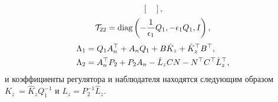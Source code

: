 \begin{theorem}
\begin{equation}
\begin{bmatrix}
		\end{bmatrix},
	\end{equation}
	\begin{equation}
		\mathcal{T}_{22}=\textnormal{diag}\left(-\frac{1}{\epsilon_1}{Q}_1,-\epsilon_1{Q}_1,{I}\right),
	\end{equation}%
	\begin{align}
		\label{eq:Lambda_1}
		{\Lambda}_1&={Q}_1{A}_n^\top+{A}_n{Q}_1+{B}\hat{{K}}_z+\hat{{K}}_z^\top{B}^\top, \\
		\label{eq:Lambda_2}
		{\Lambda}_2&={A}_n^\top{P}_2+{P}_2{A}_n-\hat{{L}}_z{C}{N}-{N}^\top{C}^\top\hat{{L}}_z^\top,
	\end{align}
	и коэффициенты регулятора и наблюдателя находятся следующим образом ${K}_z\ = \hat{{K}}_z{Q}_1^{-1}$ и ${L}_z = {P}_2^{-1} \hat{{L}}_z$.
\end{theorem}
